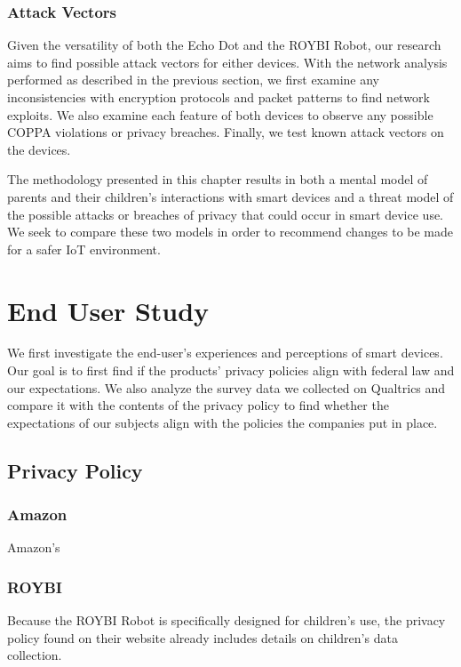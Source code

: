 \documentclass[12pt]{ucthesis}
\begin{document}
\subsection{Attack Vectors}
Given the versatility of both the Echo Dot and the ROYBI Robot, our research aims to find possible attack vectors for either devices. With the network analysis performed as described in the previous section, we first examine any inconsistencies with encryption protocols and packet patterns to find network exploits. We also examine each feature of both devices to observe any possible COPPA violations or privacy breaches. Finally, we test known attack vectors on the devices. 

The methodology presented in this chapter results in both a mental model of parents and their children's interactions with smart devices and a threat model of the possible attacks or breaches of privacy that could occur in smart device use. We seek to compare these two models in order to recommend changes to be made for a safer IoT environment.

\chapter{End User Study}
\label{ch:mental}
We first investigate the end-user's experiences and perceptions of smart devices. Our goal is to first find if the products' privacy policies align with federal law and our expectations. We also analyze the survey data we collected on Qualtrics and compare it with the contents of the privacy policy to find whether the expectations of our subjects align with the policies the companies put in place.

\section{Privacy Policy}
\subsection{Amazon}
Amazon's 

\subsection{ROYBI}
Because the ROYBI Robot is specifically designed for children's use, the privacy policy found on their website already includes details on children's data collection. 
\end{document}
